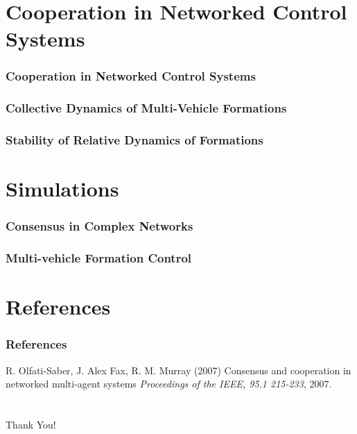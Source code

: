 \documentclass{beamer}
\begin{document}
\section{Cooperation in Networked Control Systems}

\begin{frame}
\frametitle{Cooperation in Networked Control Systems}


\end{frame}

\begin{frame}
\frametitle{Collective Dynamics of Multi-Vehicle Formations}

\end{frame}

\begin{frame}
\frametitle{Stability of Relative Dynamics of Formations}

\end{frame}

\section{Simulations}

\begin{frame}
\frametitle{Consensus in Complex Networks}


\end{frame}


\begin{frame}
\frametitle{Multi-vehicle Formation Control}


\end{frame}

\section{References}

\begin{frame}
\frametitle{References}
\footnotesize{
\begin{thebibliography}{99} %

 R. Olfati-Saber, J. Alex Fax, R. M. Murray (2007)
\newblock Consensus and cooperation in networked multi-agent systems
\newblock \emph{Proceedings of the IEEE, 95.1 215-233}, 2007.

\end{thebibliography}
}
\end{frame}

\section{}
\begin{frame}
\begin{center}
\Huge {Thank You!}
\end{center}
\end{frame}

\end{document}
